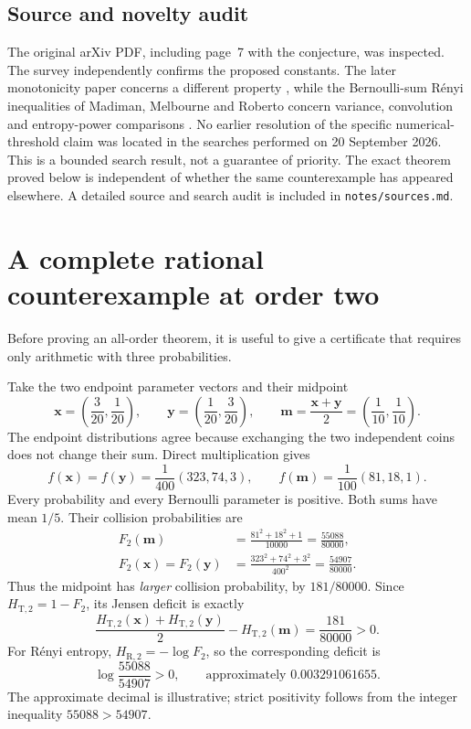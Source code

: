 \documentclass[11pt]{article}
\numberwithin{equation}{section}
\theoremstyle{definition}
\theoremstyle{remark}
\begin{document}
\subsection{Source and novelty audit}
The original arXiv PDF, including page~7 with the conjecture, was inspected.
The survey independently confirms the proposed constants. The later
monotonicity paper concerns a different property \cite{HJ2019}, while the
Bernoulli-sum R\'enyi inequalities of Madiman, Melbourne and Roberto concern
variance, convolution and entropy-power comparisons \cite{MMR2023}.
No earlier resolution of the specific numerical-threshold claim was located
in the searches performed on 20 September 2026. This is a bounded search
result, not a guarantee of priority. The exact theorem proved below is
independent of whether the same counterexample has appeared elsewhere.
A detailed source and search audit is included in \texttt{notes/sources.md}.

\section{A complete rational counterexample at order two}
Before proving an all-order theorem, it is useful to give a certificate that
requires only arithmetic with three probabilities.

Take the two endpoint parameter vectors and their midpoint
\begin{equation}
 \boldsymbol x=\left(\frac3{20},\frac1{20}\right),\qquad
 \boldsymbol y=\left(\frac1{20},\frac3{20}\right),\qquad
 \boldsymbol m=\frac{\boldsymbol x+\boldsymbol y}{2}
 =\left(\frac1{10},\frac1{10}\right).\label{eq:witness}
\end{equation}
The endpoint distributions agree because exchanging the two independent
coins does not change their sum. Direct multiplication gives
\begin{equation}
 f(\boldsymbol x)=f(\boldsymbol y)=\frac1{400}(323,74,3),\qquad
 f(\boldsymbol m)=\frac1{100}(81,18,1).
\end{equation}
Every probability and every Bernoulli parameter is positive. Both sums have
mean $1/5$. Their collision probabilities are
\begin{align}
 F_2(\boldsymbol m)&=\frac{81^2+18^2+1}{10000}
 =\frac{55088}{80000},\\
 F_2(\boldsymbol x)=F_2(\boldsymbol y)&=
 \frac{323^2+74^2+3^2}{400^2}
 =\frac{54907}{80000}.
\end{align}
Thus the midpoint has \emph{larger} collision probability, by
$181/80000$. Since $H_{\mathrm T,2}=1-F_2$, its Jensen deficit is exactly
\begin{equation}
 \frac{H_{\mathrm T,2}(\boldsymbol x)+H_{\mathrm T,2}(\boldsymbol y)}2
 -H_{\mathrm T,2}(\boldsymbol m)
 =\frac{181}{80000}>0.\label{eq:exactgap}
\end{equation}
For R\'enyi entropy, $H_{\mathrm R,2}=-\log F_2$, so the corresponding deficit
is
\begin{equation}
 \log\frac{55088}{54907}>0,
 \qquad\text{approximately }0.003291061655.\label{eq:renyigap}
\end{equation}
The approximate decimal is illustrative; strict positivity follows from the
integer inequality $55088>54907$.
\end{document}
